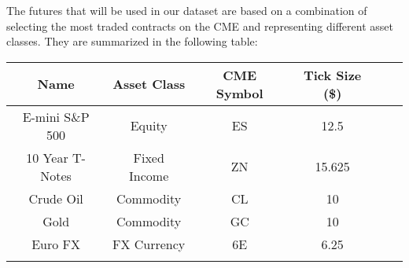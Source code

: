 The futures that will be used in our dataset are based on a combination of selecting the most traded contracts on the CME and representing different asset classes. They are summarized in the following table:

\begin{center}
\begin{tabular}{SSSSSS} \toprule
    {Name} & {Asset Class} & {CME Symbol} & {Tick Size (\$)}\\ \midrule
    {E-mini S\&P 500}  & {Equity} & {ES} & 12.5  \\
    {10 Year T-Notes}  & {Fixed Income}  & {ZN} & 15.625   \\
    {Crude Oil}  & {Commodity}  & {CL} & 10    \\
    {Gold} & {Commodity}  & {GC} & 10   \\
    {Euro FX}  & {FX Currency}  & {6E} & 6.25  \\ \bottomrule
\label{futures}
\end{tabular}
\end{center}

